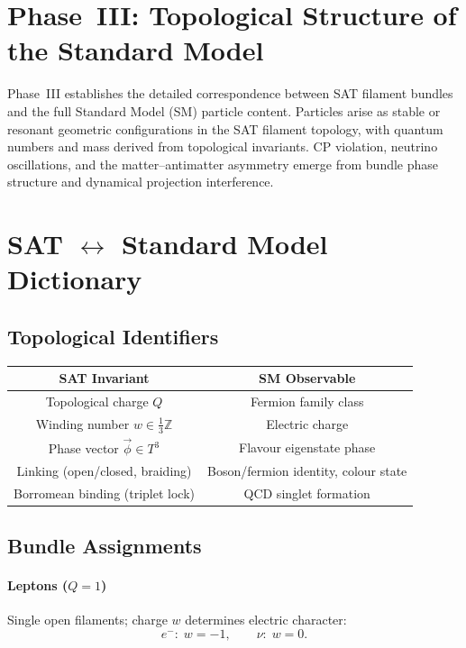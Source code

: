 
\section{Phase~III: Topological Structure of the Standard Model}

Phase~III establishes the detailed correspondence between SAT filament bundles and the full Standard Model (SM) particle content. Particles arise as stable or resonant geometric configurations in the SAT filament topology, with quantum numbers and mass derived from topological invariants. CP violation, neutrino oscillations, and the matter--antimatter asymmetry emerge from bundle phase structure and dynamical projection interference.

\tableofcontents

\section{SAT $\leftrightarrow$ Standard Model Dictionary}

\subsection{Topological Identifiers}

\begin{center}
\begin{tabular}{|c|c|}
\hline
SAT Invariant & SM Observable\\\hline
Topological charge $Q$ & Fermion family class \\
Winding number $w\in\frac13\mathbb Z$ & Electric charge \\
Phase vector $\vec\phi\in T^3$ & Flavour eigenstate phase \\
Linking (open/closed, braiding) & Boson/fermion identity, colour state \\
Borromean binding (triplet lock) & QCD singlet formation \\\hline
\end{tabular}
\end{center}

\subsection{Bundle Assignments}

\paragraph{Leptons ($Q=1$)}
Single open filaments; charge $w$ determines electric character:
\[
e^-:\; w=-1, \qquad \nu:\; w=0.
\]

